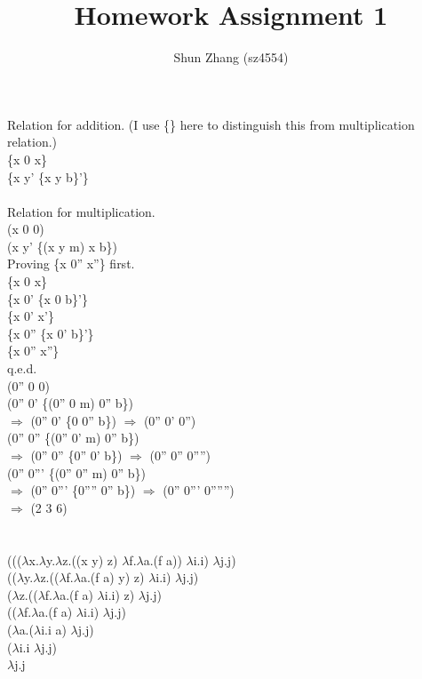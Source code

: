 \documentclass[12pt]{article}
\title{Homework Assignment 1}
\author{Shun Zhang (sz4554)}
\begin{document}
\maketitle
\section{}
Relation for addition. (I use \{\} here to distinguish this from multiplication relation.)\\
\{x 0 x\}\\
\{x y' \{x y b\}'\}\\
\\
Relation for multiplication.\\
(x 0 0)\\
(x y' \{(x y m) x b\})\\

Proving \{x 0'' x''\} first.\\
\{x 0 x\}\\
\{x 0' \{x 0 b\}'\}\\
\{x 0' x'\}\\
\{x 0'' \{x 0' b\}'\}\\
\{x 0'' x''\}\\
q.e.d.\\

(0'' 0 0)\\
(0'' 0' \{(0'' 0 m) 0'' b\})\\
$\Rightarrow$ (0'' 0' \{0 0'' b\}) $\Rightarrow$ (0'' 0' 0'')\\
(0'' 0'' \{(0'' 0' m) 0'' b\})\\
$\Rightarrow$ (0'' 0'' \{0'' 0' b\}) $\Rightarrow$ (0'' 0'' 0'''')\\
(0'' 0''' \{(0'' 0'' m) 0'' b\})\\
$\Rightarrow$ (0'' 0''' \{0'''' 0'' b\}) $\Rightarrow$ (0'' 0''' 0'''''')\\
$\Rightarrow$ (2 3 6)\\

\section{}
((($\lambda$x.$\lambda$y.$\lambda$z.((x y) z) $\lambda$f.$\lambda$a.(f a)) $\lambda$i.i) $\lambda$j.j)\\
(($\lambda$y.$\lambda$z.(($\lambda$f.$\lambda$a.(f a) y) z) $\lambda$i.i) $\lambda$j.j)\\
($\lambda$z.(($\lambda$f.$\lambda$a.(f a) $\lambda$i.i) z) $\lambda$j.j)\\
(($\lambda$f.$\lambda$a.(f a) $\lambda$i.i) $\lambda$j.j)\\
($\lambda$a.($\lambda$i.i a) $\lambda$j.j)\\
($\lambda$i.i $\lambda$j.j)\\
$\lambda$j.j
\end{document}
